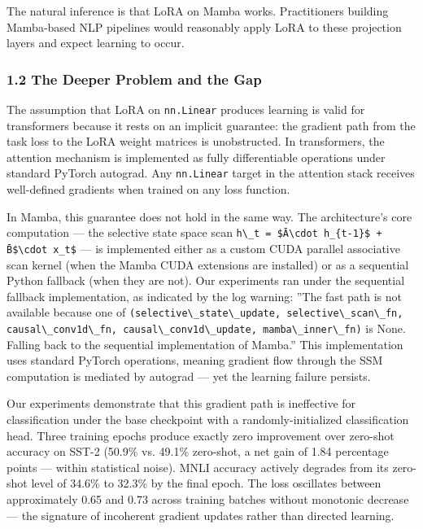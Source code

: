 The natural inference is that LoRA on Mamba works. Practitioners building Mamba-based NLP pipelines would reasonably apply LoRA to these projection layers and expect learning to occur.

\subsubsection{1.2 The Deeper Problem and the Gap}

The assumption that LoRA on \texttt{nn.Linear} produces learning is valid for transformers because it rests on an implicit guarantee: the gradient path from the task loss to the LoRA weight matrices is unobstructed. In transformers, the attention mechanism is implemented as fully differentiable operations under standard PyTorch autograd. Any \texttt{nn.Linear} target in the attention stack receives well-defined gradients when trained on any loss function.

In Mamba, this guarantee does not hold in the same way. The architecture's core computation --- the selective state space scan \texttt{h\textbackslash \_t = \$Ā\textbackslash cdot h\_\{t-1\}\$ + B̄\$\textbackslash cdot x\_t\$} --- is implemented either as a custom CUDA parallel associative scan kernel (when the Mamba CUDA extensions are installed) or as a sequential Python fallback (when they are not). Our experiments ran under the sequential fallback implementation, as indicated by the log warning: ''The fast path is not available because one of \texttt{(selective\textbackslash \_state\textbackslash \_update, selective\textbackslash \_scan\textbackslash \_fn, causal\textbackslash \_conv1d\textbackslash \_fn, causal\textbackslash \_conv1d\textbackslash \_update, mamba\textbackslash \_inner\textbackslash \_fn)} is None. Falling back to the sequential implementation of Mamba.'' This implementation uses standard PyTorch operations, meaning gradient flow through the SSM computation is mediated by autograd --- yet the learning failure persists.

Our experiments demonstrate that this gradient path is ineffective for classification under the base checkpoint with a randomly-initialized classification head. Three training epochs produce exactly zero improvement over zero-shot accuracy on SST-2 (50.9\% vs. 49.1\% zero-shot, a net gain of 1.84 percentage points --- within statistical noise). MNLI accuracy actively degrades from its zero-shot level of 34.6\% to 32.3\% by the final epoch. The loss oscillates between approximately 0.65 and 0.73 across training batches without monotonic decrease --- the signature of incoherent gradient updates rather than directed learning.

